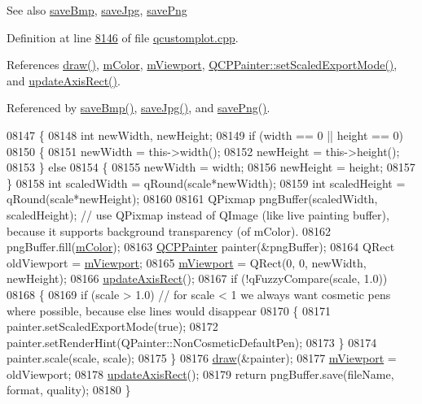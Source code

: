 \begin{DoxySeeAlso}{See also}
\hyperlink{a00116_a6629d9e8e6da4bf18055ee0257fdce9a}{save\+Bmp}, \hyperlink{a00116_a490c722092d1771e8ce4a7a73dfd84ab}{save\+Jpg}, \hyperlink{a00116_a7636261aff1f6d25c9da749ece3fc8b8}{save\+Png} 
\end{DoxySeeAlso}


Definition at line \hyperlink{a00115_source_l08146}{8146} of file \hyperlink{a00115_source}{qcustomplot.\+cpp}.



References \hyperlink{a00116_a2e9b3d14dffa43c79835869d488936c9}{draw()}, \hyperlink{a00116_source_l02114}{m\+Color}, \hyperlink{a00116_source_l02110}{m\+Viewport}, \hyperlink{a00115_source_l13271}{Q\+C\+P\+Painter\+::set\+Scaled\+Export\+Mode()}, and \hyperlink{a00115_source_l08116}{update\+Axis\+Rect()}.



Referenced by \hyperlink{a00115_source_l07488}{save\+Bmp()}, \hyperlink{a00115_source_l07456}{save\+Jpg()}, and \hyperlink{a00115_source_l07421}{save\+Png()}.


\begin{DoxyCode}
08147 \{
08148   \textcolor{keywordtype}{int} newWidth, newHeight;
08149   \textcolor{keywordflow}{if} (width == 0 || height == 0)
08150   \{
08151     newWidth = this->width();
08152     newHeight = this->height();
08153   \} \textcolor{keywordflow}{else}
08154   \{
08155     newWidth = width;
08156     newHeight = height;
08157   \}
08158   \textcolor{keywordtype}{int} scaledWidth = qRound(scale*newWidth);
08159   \textcolor{keywordtype}{int} scaledHeight = qRound(scale*newHeight);
08160 
08161   QPixmap pngBuffer(scaledWidth, scaledHeight); \textcolor{comment}{// use QPixmap instead of QImage (like live painting
       buffer), because it supports background transparency (of mColor).}
08162   pngBuffer.fill(\hyperlink{a00116_ac071280171e215ffc7d416118bc28d90}{mColor});
08163   \hyperlink{a00047}{QCPPainter} painter(&pngBuffer);
08164   QRect oldViewport = \hyperlink{a00116_a69feeea9d5254eab8ba7f9be13f85e0b}{mViewport};
08165   \hyperlink{a00116_a69feeea9d5254eab8ba7f9be13f85e0b}{mViewport} = QRect(0, 0, newWidth, newHeight);
08166   \hyperlink{a00116_a428242419d3a1b63f2cbff637986c35c}{updateAxisRect}();
08167   \textcolor{keywordflow}{if} (!qFuzzyCompare(scale, 1.0))
08168   \{
08169     \textcolor{keywordflow}{if} (scale > 1.0) \textcolor{comment}{// for scale < 1 we always want cosmetic pens where possible, because else lines would
       disappear}
08170     \{
08171       painter.setScaledExportMode(\textcolor{keyword}{true});
08172       painter.setRenderHint(QPainter::NonCosmeticDefaultPen);
08173     \}
08174     painter.scale(scale, scale);
08175   \}
08176   \hyperlink{a00116_a2e9b3d14dffa43c79835869d488936c9}{draw}(&painter);
08177   \hyperlink{a00116_a69feeea9d5254eab8ba7f9be13f85e0b}{mViewport} = oldViewport;
08178   \hyperlink{a00116_a428242419d3a1b63f2cbff637986c35c}{updateAxisRect}();
08179   \textcolor{keywordflow}{return} pngBuffer.save(fileName, format, quality);
08180 \}
\end{DoxyCode}


